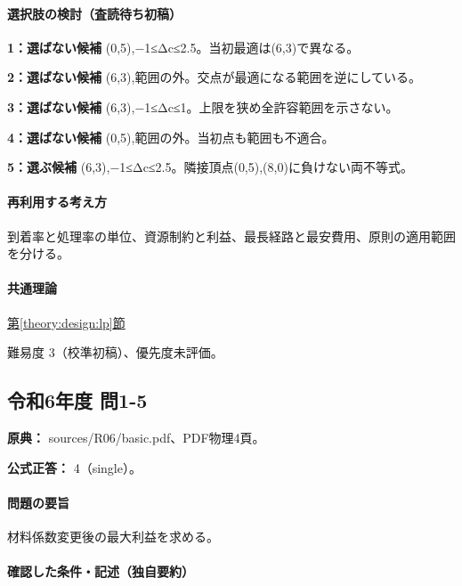 \paragraph{選択肢の検討（査読待ち初稿）}\mbox{}\par

\noindent\textbf{1：選ばない候補} (0,5),−1≤Δc≤2.5。当初最適は(6,3)で異なる。\par

\noindent\textbf{2：選ばない候補} (6,3),範囲の外。交点が最適になる範囲を逆にしている。\par

\noindent\textbf{3：選ばない候補} (6,3),−1≤Δc≤1。上限を狭め全許容範囲を示さない。\par

\noindent\textbf{4：選ばない候補} (0,5),範囲の外。当初点も範囲も不適合。\par

\noindent\textbf{5：選ぶ候補} (6,3),−1≤Δc≤2.5。隣接頂点(0,5),(8,0)に負けない両不等式。\par

\paragraph{再利用する考え方} 到着率と処理率の単位、資源制約と利益、最長経路と最安費用、原則の適用範囲を分ける。

\paragraph{共通理論} \hyperref[theory:design:lp]{第\ref*{theory:design:lp}節}

\par 難易度 3（校準初稿）、優先度未評価。

\subsection{令和6年度 問1-5}
\label{q:r06-reg-basic-1-5}

\noindent\textbf{原典：} sources/R06/basic.pdf、PDF物理4頁。

\textbf{公式正答：} 4（single）。

\paragraph{問題の要旨} 材料係数変更後の最大利益を求める。

\paragraph{確認した条件・記述（独自要約）}\mbox{}\par

